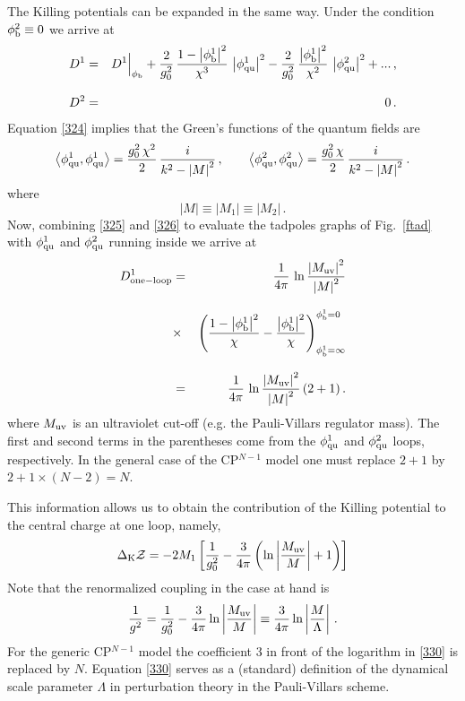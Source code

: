 \documentclass[epsfig,12pt]{article}
\def\beq{\begin{equation}}
\def\eeq{\end{equation}}
\def\beq{\begin{equation}}
\def\eeq{\end{equation}}
\begin{document}
	The Killing potentials can be expanded in the same way. Under the condition $\phi^2_{\rm b}\equiv 0$ 
	we arrive at
\begin{eqnarray}
D^1
&=&
 D^1\Big|_{\phi_{\rm b}} + \frac{2}{g_0^2}\, \frac{1-\left| \phi^1_{\rm b}
\right|^2}{\chi^3}\, \left|  \phi^1_{\rm qu}\right|^2 
- \frac{2}{g_0^2}\, \frac{\left| \phi^1_{\rm b}
\right|^2}{\chi^2}\, \left|  \phi^2_{\rm qu}\right|^2 + ...\,,
\nonumber\\[3mm]
D^2
&=&
0\,.
\label{325}
\end{eqnarray}
Equation \eqref{324}
implies that the Green's functions of the quantum fields are
\beq
\left\langle \phi^1_{\rm qu}, \phi^1_{\rm qu}\right\rangle = \frac{g_0^2\,\chi^2 }{2}\, \frac{i}{k^2-\left|M\right|^2}\,,\qquad
\left\langle \phi^2_{\rm qu}, \phi^2_{\rm qu}\right\rangle = \frac{g_0^2\,\chi }{2 }\, \frac{i}{k^2-\left|M\right|^2}\,.
\label{326}
\eeq
where 
\beq
\left|M\right|\equiv \left|M_1\right|\equiv \left|M_2\right|\,.
\eeq
	Now, combining \eqref{325} and \eqref{326} to evaluate the tadpoles graphs of Fig.~\ref{ftad}
	with $\phi^1_{\rm qu}$ and $\phi^2_{\rm qu}$ running inside we arrive at
\begin{eqnarray}
	D^1_{\rm one-loop} 
	&=&
	\frac{1}{4\pi}\, \ln \frac{\left| M_{\rm uv}\right|^2}{\left|M\right|^2}
 \nonumber\\[3mm]
 	&\times&
	\left( \frac{1-\left| \phi^1_{\rm b}
	  \right|^2}{\chi} - \frac{\left| \phi^1_{\rm b}
	  \right|^2}{\chi}
	\right)^{\phi_{\rm b}^{1}=0}_{\phi_{\rm b}^{1}=\infty}
  \nonumber\\[3mm]
	&=&
	  \frac{1}{4\pi}\, \ln \frac{\left| M_{\rm uv}\right|^2}{\left|M\right|^2}
	  \left(2 + 1
	  \right).
\end{eqnarray}
	where $M_{\rm uv}$ is an ultraviolet cut-off (e.g. the Pauli-Villars regulator mass). 
	The first and second terms in the parentheses come from the $\phi^1_{\rm qu}$ and $\phi^2_{\rm qu}$ loops, respectively. 
	In the general case of the CP$^{N-1}$ model
	one must replace $2+1$ by $2+ 1\times (N-2) = N$.

	This information allows us to obtain the contribution of the Killing potential to the central charge at one loop, namely,
\beq
\Delta_{\rm K}{\mathcal Z} = -2M_1\left[\frac{1}{g_0^2} -
\frac{3}{4\pi} \left(\ln\left|\frac{M_{\rm uv}}{M} 
\right| +1
\right)
\right]
\label{329}
\eeq
	Note that the renormalized coupling in the case at hand is \cite{Novikov:1984ac}
\beq
\frac{1}{g^2}=
\frac{1}{g_0^2} -
\frac{3}{4\pi}  \ln\left|\frac{M_{\rm uv}}{M} \right | \equiv   \frac{3}{4\pi}  \ln\left|\frac{M}{\Lambda}\right|\,.
\label{330}
\eeq
	For the generic CP$^{N-1}$ model the coefficient 3 in front of the logarithm 
	in \eqref{330} is replaced by $N$. 
	Equation \eqref{330} serves as a (standard) definition of the dynamical scale parameter $\Lambda$ 
	in perturbation theory in the Pauli-Villars scheme.
\end{document}
